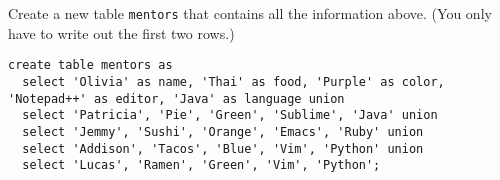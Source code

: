 \question Create a new table \lstinline$mentors$ that contains all the information above.
(You only have to write out the first two rows.)

\begin{solution}[1in]
\begin{lstlisting}
create table mentors as
  select 'Olivia' as name, 'Thai' as food, 'Purple' as color, 'Notepad++' as editor, 'Java' as language union
  select 'Patricia', 'Pie', 'Green', 'Sublime', 'Java' union
  select 'Jemmy', 'Sushi', 'Orange', 'Emacs', 'Ruby' union
  select 'Addison', 'Tacos', 'Blue', 'Vim', 'Python' union
  select 'Lucas', 'Ramen', 'Green', 'Vim', 'Python';
\end{lstlisting}
\end{solution}
